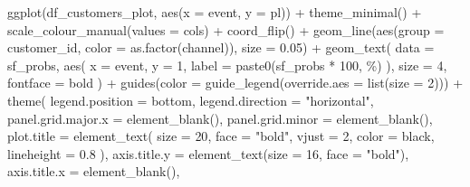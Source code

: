 \documentclass[
]{book}
\newenvironment{Shaded}{\begin{snugshade}}{\end{snugshade}}
\newcommand{\AttributeTok}[1]{\textcolor[rgb]{0.77,0.63,0.00}{#1}}
\newcommand{\DecValTok}[1]{\textcolor[rgb]{0.00,0.00,0.81}{#1}}
\newcommand{\FloatTok}[1]{\textcolor[rgb]{0.00,0.00,0.81}{#1}}
\newcommand{\FunctionTok}[1]{\textcolor[rgb]{0.00,0.00,0.00}{#1}}
\newcommand{\NormalTok}[1]{#1}
\newcommand{\SpecialCharTok}[1]{\textcolor[rgb]{0.00,0.00,0.00}{#1}}
\newcommand{\StringTok}[1]{\textcolor[rgb]{0.31,0.60,0.02}{#1}}
\begin{document}
\begin{Shaded}
\begin{Highlighting}[]
\FunctionTok{ggplot}\NormalTok{(df\_customers\_plot, }\FunctionTok{aes}\NormalTok{(}\AttributeTok{x =}\NormalTok{ event, }\AttributeTok{y =}\NormalTok{ pl)) }\SpecialCharTok{+}
    \FunctionTok{theme\_minimal}\NormalTok{() }\SpecialCharTok{+}
    \FunctionTok{scale\_colour\_manual}\NormalTok{(}\AttributeTok{values =}\NormalTok{ cols) }\SpecialCharTok{+}
    \FunctionTok{coord\_flip}\NormalTok{() }\SpecialCharTok{+}
    \FunctionTok{geom\_line}\NormalTok{(}\FunctionTok{aes}\NormalTok{(}\AttributeTok{group =}\NormalTok{ customer\_id, }\AttributeTok{color =} \FunctionTok{as.factor}\NormalTok{(channel)), }\AttributeTok{size =} \FloatTok{0.05}\NormalTok{) }\SpecialCharTok{+}
    \FunctionTok{geom\_text}\NormalTok{(}
        \AttributeTok{data =}\NormalTok{ sf\_probs,}
        \FunctionTok{aes}\NormalTok{(}
            \AttributeTok{x =}\NormalTok{ event,}
            \AttributeTok{y =} \DecValTok{1}\NormalTok{,}
            \AttributeTok{label =} \FunctionTok{paste0}\NormalTok{(sf\_probs }\SpecialCharTok{*} \DecValTok{100}\NormalTok{, }\StringTok{\textquotesingle{}\%\textquotesingle{}}\NormalTok{)}
\NormalTok{        ),}
        \AttributeTok{size =} \DecValTok{4}\NormalTok{,}
        \AttributeTok{fontface =} \StringTok{\textquotesingle{}bold\textquotesingle{}}
\NormalTok{    ) }\SpecialCharTok{+}
    \FunctionTok{guides}\NormalTok{(}\AttributeTok{color =} \FunctionTok{guide\_legend}\NormalTok{(}\AttributeTok{override.aes =} \FunctionTok{list}\NormalTok{(}\AttributeTok{size =} \DecValTok{2}\NormalTok{))) }\SpecialCharTok{+}
    \FunctionTok{theme}\NormalTok{(}
        \AttributeTok{legend.position =} \StringTok{\textquotesingle{}bottom\textquotesingle{}}\NormalTok{,}
        \AttributeTok{legend.direction =} \StringTok{"horizontal"}\NormalTok{,}
        \AttributeTok{panel.grid.major.x =} \FunctionTok{element\_blank}\NormalTok{(),}
        \AttributeTok{panel.grid.minor =} \FunctionTok{element\_blank}\NormalTok{(),}
        \AttributeTok{plot.title =} \FunctionTok{element\_text}\NormalTok{(}
            \AttributeTok{size =} \DecValTok{20}\NormalTok{,}
            \AttributeTok{face =} \StringTok{"bold"}\NormalTok{,}
            \AttributeTok{vjust =} \DecValTok{2}\NormalTok{,}
            \AttributeTok{color =} \StringTok{\textquotesingle{}black\textquotesingle{}}\NormalTok{,}
            \AttributeTok{lineheight =} \FloatTok{0.8}
\NormalTok{        ),}
        \AttributeTok{axis.title.y =} \FunctionTok{element\_text}\NormalTok{(}\AttributeTok{size =} \DecValTok{16}\NormalTok{, }\AttributeTok{face =} \StringTok{"bold"}\NormalTok{),}
        \AttributeTok{axis.title.x =} \FunctionTok{element\_blank}\NormalTok{(),}

\end{Highlighting}
\end{Shaded}
\end{document}

